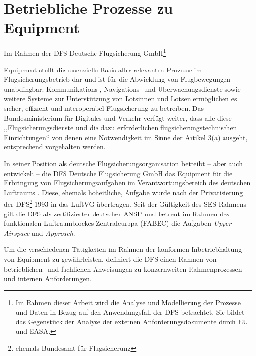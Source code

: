 \chapter{Betriebliche Prozesse zu \atmansf{} Equipment}
    
    \begin{center}
        \footnotesize
        Im Rahmen der DFS Deutsche Flugsicherung GmbH\footnote{Im Rahmen dieser Arbeit wird die Analyse und Modellierung der Prozesse und Daten in Bezug auf den Anwendungsfall der \acs{DFS} betrachtet. Sie bildet das Gegenstück der Analyse der externen Anforderungsdokumente durch \acs{EU} und \ac{EASA}.}
    \end{center}
    
    \noindent
    \atmans{} Equipment stellt die essenzielle Basis aller relevanten Prozesse im Flugsicherungsbetrieb dar und ist für die Abwicklung von Flugbewegungen unabdingbar. 
    Kommunikations-, Navigations- und Überwachungsdienste sowie weitere Systeme zur Unterstützung von Lotsinnen und Lotsen ermöglichen es sicher, effizient und interoperabel Flugsicherung zu betreiben.
    Das Bundesministerium für Digitales und Verkehr verfügt weiter, dass alle diese ,,Flugsicherungsdienste und die dazu erforderlichen flugsicherungstechnischen Einrichtungen`` von denen eine Notwendigkeit im Sinne der  Artikel 3(a) ausgeht, entsprechend vorgehalten werden.
    \cite[§27 d]{luftvg}
    
    \medskip
    In seiner Position als deutsche Flugsicherungsorganisation betreibt -- aber auch entwickelt -- die \ac{DFS} Deutsche Flugsicherung GmbH das \atmans{} Equipment für die Erbringung von Flugsicherungsaufgaben im Verantwortungsbereich des deutschen Luftraums 
    \cite[§27 c]{luftvg}.
    Diese, ehemals hoheitliche, Aufgabe wurde nach der Privatisierung der \ac{DFS}\footnote{ehemals Bundesamt für Flugsicherung} 1993 in das \ac{LuftVG} übertragen.
    Seit der Gültigkeit des \ac{SES} Rahmens gilt die \ac{DFS} als zertifizierter deutscher \acf{ANSP} und betreut im Rahmen des funktionalen Luftraumblockes Zentraleuropa (\acs{FABEC}) die Aufgaben \textit{Upper Airspace} und \textit{Approach}. 
    
    \medskip
    Um die verschiedenen Tätigkeiten im Rahmen der konformen Inbetriebhaltung von \atmans{} Equipment zu gewährleisten, definiert die \ac{DFS} einen Rahmen von betrieblichen- und fachlichen Anweisungen zu konzernweiten Rahmenprozessen und internen Anforderungen. \cite[vgl.][]{fa_freigaben,ba_technik}   
    
